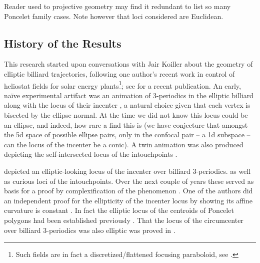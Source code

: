 
Reader used to projective geometry may find it redundant to list so many Poncelet family cases. Note however that loci considered are Euclidean.

\subsection*{History of the Results}

This research started upon conversations with Jair Koiller about the geometry of elliptic billiard trajectories, following one author's recent work in control of heliostat fields for solar energy plants\footnote{Such fields are in fact a discretized/flattened focusing paraboloid, see \cite{sundrop2016,esolar2017}.}; see \cite{gross2020-solar} for a recent publication. An early, naïve experimental artifact was an animation of 3-periodics in the elliptic billiard along with the locus of their incenter \cite{dsr_vid11incenter}, a natural choice given that each vertex is bisected by the ellipse normal. At the time we did not know this locus could be an ellipse, and indeed, how rare a find this is (we have conjecture that amongst the 5d space of possible ellipse pairs, only in the confocal pair -- a 1d subspace -- can the locus of the incenter be a conic). A twin animation was also produced depicting the self-intersected locus of the intouchpoints \cite{dsr_vid11e}.

depicted an elliptic-looking locus of the incenter over billiard 3-periodics.  as well as curious loci of the intouchpoints. Over the next couple of years these served as basis for a proof by complexification of the phenomenon \cite{olga14}. One of the authors did an independent proof for the ellipticity of the incenter locus by showing its affine curvature is constant \cite{garcia2019-incenter}. In fact the elliptic locus of the centroids of Poncelet polygons had been established previously \cite{schwartz2016-com}. That the locus of the circumcenter over billiard 3-periodics was also elliptic was proved in \cite{corentin2021-circum}.  

